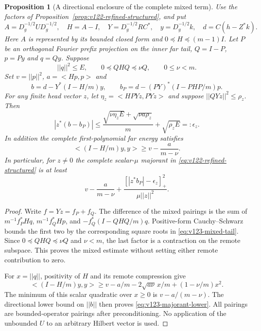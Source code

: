 \documentclass[11pt]{article}
\def\norm#1{||#1||}%
\def\ip#1#2{<#1,#2>}%
\newtheorem{proposition}[theorem]{Proposition}
\theoremstyle{remark}
\newcommand{\norm}[1]{\left\lVert #1\right\rVert}
\newcommand{\ip}[2]{\left\langle #1,#2\right\rangle}
\begin{document}
\begin{proposition}[A directional enclosure of the complete mixed term]
\label{prop:v123-mixed-tail}
Use the factors of Proposition~\ref{prop:v122-refined-structured},
and put
\[
 A=D_g^{-1/2}UD_g^{-1/2},\quad H=A-I,\quad
 Y=D_g^{-1/2}RC^*,\quad y=D_g^{-1/2}k,\quad d=C(h-Z^*k).
\]
Here $A$ is represented by its bounded closed form and
$0\preceq H\preceq(m-1)I$. Let $P$ be an orthogonal Fourier
prefix projection on the inner far tail, $Q=I-P$, $p=Py$ and
$q=Qy$. Suppose
\[
 \norm q^2\le E,\qquad 0\preceq QHQ\preceq\nu Q,
 \qquad 0\le\nu<m.
\]
Set $v=\norm p^2$, $a=\ip{Hp}{p}$ and
\[
 b=d-Y^*(I-H/m)y,\qquad
 b_P=d-(PY)^*(I-PHP/m)p.
\]
For any finite head vector $z$, let
$\eta_z=\ip{H PYz}{PYz}$ and suppose
$\norm{QYz}^2\le\rho_z$. Then
\begin{equation}\label{eq:v123-mixed-tail}
 |z^*(b-b_P)|\le
 \frac{\sqrt{\nu\eta_z E}+\sqrt{\nu a\rho_z}}{m}
       +\sqrt{\rho_z E}=:\epsilon_z.
\end{equation}
In addition the complete first-polynomial far energy satisfies
\begin{equation}\label{eq:v123-far-lower}
 \ip{(I-H/m)y}{y}\ge v-\frac{a}{m-\nu}.
\end{equation}
In particular, for $z\ne0$ the complete scalar-$\mu$ majorant
in \eqref{eq:v122-refined-structured} is at least
\begin{equation}\label{eq:v123-majorant-lower}
 v-\frac{a}{m-\nu}
 +\frac{[|z^*b_P|-\epsilon_z]_+^2}{\mu\norm z^2}.
\end{equation}
\end{proposition}
\begin{proof}
Write $f=Yz=f_P+f_Q$. The difference of the mixed pairings is
the sum of $m^{-1}f_P^*Hq$, $m^{-1}f_Q^*Hp$, and
$-f_Q^*(I-QHQ/m)q$. Positive-form Cauchy--Schwarz bounds the
first two by the corresponding square roots in
\eqref{eq:v123-mixed-tail}. Since $0\preceq QHQ\preceq\nu Q$
and $\nu<m$, the last factor is a contraction on the remote
subspace. This proves the mixed estimate without setting either
remote contribution to zero.

For $x=\norm q$, positivity of $H$ and its remote compression give
\[
 \ip{(I-H/m)y}{y}
 \ge v-a/m-2\sqrt{a\nu}\,x/m+(1-\nu/m)x^2.
\]
The minimum of this scalar quadratic over $x\ge0$ is
$v-a/(m-\nu)$. The directional lower bound on $\norm b$
then proves \eqref{eq:v123-majorant-lower}. All pairings are
bounded-operator pairings after preconditioning. No application
of the unbounded $U$ to an arbitrary Hilbert vector is used.
\end{proof}
\end{document}
